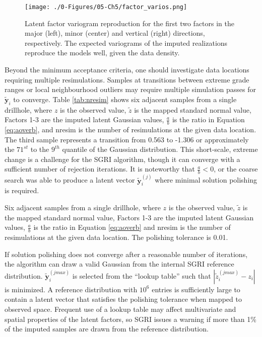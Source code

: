 \begin{figure}[htb!]
    \centering
    \texttt{[image: ./0-Figures/05-Ch5/factor\_varios.png]}
    \caption{Latent factor variogram reproduction for the first two factors in the major (left), minor (center) and vertical (right) directions, respectively. The expected variograms of the imputed realizations reproduce the models well, given the data density.}
    \label{fig:factor_varios}
\end{figure}

Beyond the minimum acceptance criteria, one should investigate data locations requiring multiple resimulations. Samples at transitions between extreme grade ranges or local neighbourhood outliers may require multiple simulation passes for $\tilde{\mathbf{y}}_{i}$ to converge. Table \ref{tab:nresim} shows six adjacent samples from a single drillhole, where $z$ is the observed value, $\tilde{z}$ is the mapped standard normal value, Factors 1-3 are the imputed latent Gaussian values, $\frac{a}{b}$ is the ratio in Equation \ref{eq:aoverb}, and nresim is the number of resimulations at the given data location. The third sample represents a transition from 0.563 to -1.306 or approximately the $71^{st}$ to the $9^{th}$ quantile of the Gaussian distribution. This short-scale, extreme change is a challenge for the \gls{SGRI} algorithm, though it can converge with a sufficient number of rejection iterations. It is noteworthy that $\frac{a}{b} < 0$, or the coarse search was able to produce a latent vector $\tilde{\mathbf{y}}_{i}^{(j)}$ where minimal solution polishing is required.

\begin{table}[!htb]
    \centering
    \caption{Six adjacent samples from a single drillhole, where $z$ is the observed value, $\tilde{z}$ is the mapped standard normal value, Factors 1-3 are the imputed latent Gaussian values, $\frac{a}{b}$ is the ratio in Equation \ref{eq:aoverb} and nresim is the number of resimulations at the given data location. The polishing tolerance is 0.01. }
    \resizebox{0.9\width}{!}{}
    \label{tab:nresim}
\end{table}

If solution polishing does not converge after a reasonable number of iterations, the algorithm can draw a valid Gaussian from the internal \gls{SGRI} reference distribution. $\tilde{\mathbf{y}}_{i}^{(jmax)}$ is selected from the ``lookup table'' such that $|\tilde{z}_{i}^{(jmax)} - z_{i}|$ is minimized. A reference distribution with $10^{6}$ entries is sufficiently large to contain a latent vector that satisfies the polishing tolerance when mapped to observed space. Frequent use of a lookup table may affect multivariate and spatial properties of the latent factors, so \gls{SGRI} issues a warning if more than 1\% of the imputed samples are drawn from the reference distribution.

